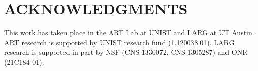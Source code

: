 \section{ACKNOWLEDGMENTS}

This work has taken place in the ART Lab at UNIST and LARG at UT Austin.
ART research is supported by UNIST research fund (1.120038.01).
LARG research is supported in part by NSF (CNS-1330072, CNS-1305287)
and ONR (21C184-01).
